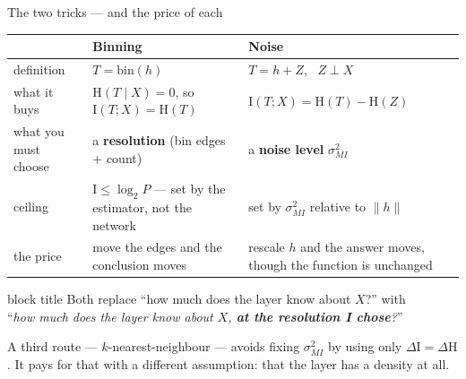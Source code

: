 \documentclass[aspectratio=169,11pt]{beamer}
\newcommand{\I}{\mathrm{I}}
\newcommand{\HH}{\mathrm{H}}
\newcommand{\smi}{\sigma_{MI}}
\begin{document}
\begin{frame}{The two tricks --- and the price of each}
\centering\footnotesize
\begin{tabular}{@{}p{3.1cm}p{4.3cm}p{4.6cm}@{}}
\toprule
 & \textbf{Binning} & \textbf{Noise} \\
\midrule
definition & $T=\mathrm{bin}(h)$ & $T = h + Z$, \ $Z\perp X$ \\[3pt]
what it buys &
  $\HH(T\mid X)=0$, so $\I(T;X)=\HH(T)$ &
  $\I(T;X)=\HH(T)-\HH(Z)$ \\[3pt]
what you must choose &
  a \textbf{resolution} (bin edges + count) &
  a \textbf{noise level} $\smi^2$ \\[3pt]
ceiling &
  $\I \le \log_2 P$ --- set by the estimator, not the network &
  set by $\smi^2$ relative to $\|h\|$ \\[3pt]
\textcolor{bad}{the price} &
  \textcolor{bad}{move the edges and the conclusion moves} &
  \textcolor{bad}{rescale $h$ and the answer moves, though the function is unchanged} \\
\bottomrule
\end{tabular}
\medskip
\begin{beamercolorbox}[sep=4pt,center,rounded=true]{block title}
\small Both replace ``how much does the layer know about $X$?'' with\\
``\emph{how much does the layer know about $X$, \textbf{at the resolution I chose}?}''
\end{beamercolorbox}
\smallskip
{\footnotesize\centering
A third route --- $k$-nearest-neighbour --- avoids fixing $\smi^2$ by using only
$\Delta\I=\Delta\HH$. It pays for that with a different assumption: that the layer has
a density at all.\par}
\end{frame}
\end{document}
